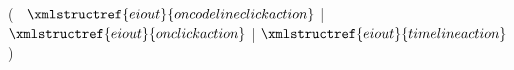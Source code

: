 (
$~$ $\xmlstructref{eiout}{oncodelineclickaction}$
| $\xmlstructref{eiout}{onclickaction}$
| $\xmlstructref{eiout}{timelineaction}$
)
